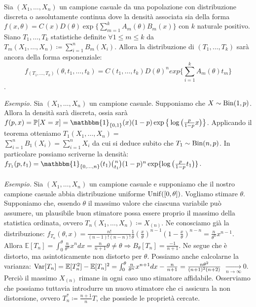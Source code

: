 \begin{theorem}
Sia $(X_1,\ldots,X_n)$ un campione casuale da una popolazione con distribuzione discreta o assolutamente continua dove la densità associata sia della forma $f(x,\theta)=C(x)D(\theta)\exp\{\sum_{m=1}^k A_m(\theta)B_m(x)\}$ con $k$ naturale positivo. Siano $T_1,\ldots,T_k$ statistiche definite $\forall 1\leq m\leq k$ da $T_m(X_1,\ldots,X_n)\coloneqq \sum_{i=1}^n B_m(X_i)$. Allora la distribuzione di $(T_1,\ldots,T_k)$ sarà ancora della forma esponenziale:
$$f_{(T_1,\ldots,T_k)}(\theta,t_1,\ldots,t_k)=C(t_1,\ldots,t_k)D(\theta)^n exp\bigg\{\sum_{i=1}^k A_m(\theta)t_m\bigg\}$$.
\end{theorem}
\textit{Esempio.} Sia $(X_1,\ldots,X_n)$ un campione casuale. Supponiamo che $X\sim \operatorname{Bin}(1,p)$. Allora la densità sarà discreta, ossia sarà $f(p,x)=\mathbb{P}[X=x]=\mathbbm{1}_{\{0,1\}}(x)(1-p)\exp\big\{\log\big(\frac{p}{1-p}x\big)\big\}$. Applicando il teorema otteniamo $T_1(X_1,\ldots,X_n)=$ \\ $\sum_{i=1}^n B_1(X_i)=\sum_{i=1}^n X_i$ da cui si deduce subito che $T_1\sim \operatorname{Bin}(n,p)$. In particolare possiamo scriverne la densità: $f_{T_1}(p,t_1)=\mathbbm{1}_{\{0,\ldots,n\}}(t_1)\binom{n}{t_1}(1-p)^n\exp\{\log\big(\frac{p}{1-p}t_1\big)\}$. \\ \\ \textit{Esempio.} Sia $(X_1,\ldots,X_n)$ un campione casuale e supponiamo che il nostro campione casuale abbia distribuzione uniforme $\operatorname{Unif}([0,\theta])$. Vogliamo stimare $\theta$. Supponiamo che, essendo $\theta$ il massimo valore che ciascuna variabile può assumere, un plausibile buon stimatore possa essere proprio il massimo della statistica ordinata, ovvero $T_n(X_1,\ldots,X_n)\coloneqq X_{(n)}$. Ne conosciamo già la distribuzione: $f_{T_n}(\theta,x)=\frac{n!}{(n-1)!(n-n)!}\frac{1}{\theta}\left(\frac{x}{\theta}\right)^{n-1}\left(1-\frac{x}{\theta}\right)^{n-n}=\frac{n}{\theta^n}x^{n-1}$. Allora $\mathbb{E}[T_n]=\int_0^\theta \frac{n}{\theta^n}x^n dx=\frac{n}{n+1}\theta \neq \theta\Longrightarrow B_{\theta}[T_n]=\frac{-1}{n+1}$. Ne segue che è distorto, ma asintoticamente non distorto per $\theta$. Possiamo anche calcolarne la varianza: $\operatorname{Var}[T_n]=\mathbb{E}[T_n^2]-\mathbb{E}[T_n]^2=\int_0^\theta \frac{n}{\theta^n}x^{n+1} dx -\frac{n}{n+1}=\frac{n\theta^2}{(n+1)^2(n+2)}$
$\xrightarrow[n\rightarrow \infty]{}0$. Perciò il massimo $X_{(n)}$ rimane in ogni caso uno stimatore affidabile. Osserviamo che possiamo tuttavia introdurre un nuovo stimatore che ci assicura la non distorsione, ovvero $T_n^*\coloneqq \frac{n+1}{n}T$, che possiede le proprietà cercate. \\ \\
